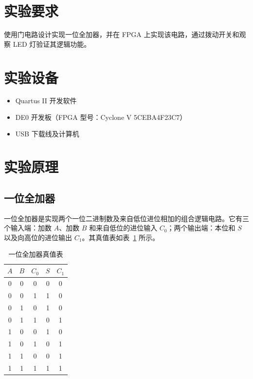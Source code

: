 \documentclass[12pt]{ctexart}
\begin{document}
\section{实验要求}

使用门电路设计实现一位全加器，并在 FPGA 上实现该电路，通过拨动开关和观察 LED 灯验证其逻辑功能。

\section{实验设备}

\begin{itemize}
    \item Quartus II 开发软件
    \item DE0 开发板（FPGA 型号：Cyclone V 5CEBA4F23C7）
    \item USB 下载线及计算机
\end{itemize}

\section{实验原理}

\subsection{一位全加器}

一位全加器是实现两个一位二进制数及来自低位进位相加的组合逻辑电路。它有三个输入端：加数 $A$、加数 $B$ 和来自低位的进位输入 $C_0$；两个输出端：本位和 $S$ 以及向高位的进位输出 $C_1$。其真值表如表~\ref{tab:truth_table} 所示。

\begin{table}[H]
    \centering
    \caption{一位全加器真值表}
    \label{tab:truth_table}
    \begin{tabular}{ccc|cc}
        \toprule
        $A$ & $B$ & $C_0$ & $S$ & $C_1$ \\
        \midrule
        0 & 0 & 0 & 0 & 0 \\
        0 & 0 & 1 & 1 & 0 \\
        0 & 1 & 0 & 1 & 0 \\
        0 & 1 & 1 & 0 & 1 \\
        1 & 0 & 0 & 1 & 0 \\
        1 & 0 & 1 & 0 & 1 \\
        1 & 1 & 0 & 0 & 1 \\
        1 & 1 & 1 & 1 & 1 \\
        \bottomrule
    \end{tabular}
\end{table}
\end{document}
